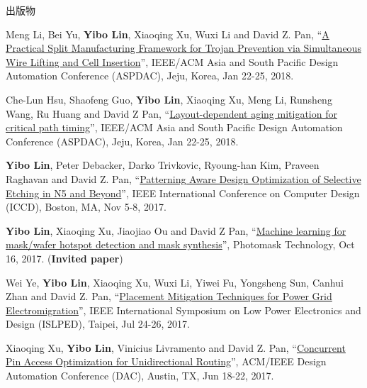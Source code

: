 \begin{rSection}{出版物}
\begin{description}[font=\normalfont]
{}
            

\item[{[C15]}]{
        Meng Li, Bei Yu, \textbf{Yibo Lin}, Xiaoqing Xu, Wuxi Li and David Z. Pan, 
    ``\href{https://doi.org/10.1109/ASPDAC.2018.8297316}{A Practical Split Manufacturing Framework for Trojan Prevention via Simultaneous Wire Lifting and Cell Insertion}'', 
    IEEE/ACM Asia and South Pacific Design Automation Conference (ASPDAC), Jeju, Korea, Jan 22-25, 2018.
    
}
            

\item[{[C14]}]{
        Che-Lun Hsu, Shaofeng Guo, \textbf{Yibo Lin}, Xiaoqing Xu, Meng Li, Runsheng Wang, Ru Huang and David Z Pan, 
    ``\href{https://doi.org/10.1109/ASPDAC.2018.8297298}{Layout-dependent aging mitigation for critical path timing}'', 
    IEEE/ACM Asia and South Pacific Design Automation Conference (ASPDAC), Jeju, Korea, Jan 22-25, 2018.
    
}
            

\item[{[C13]}]{
        \textbf{Yibo Lin}, Peter Debacker, Darko Trivkovic, Ryoung-han Kim, Praveen Raghavan and David Z. Pan, 
    ``\href{https://doi.org/10.1109/ICCD.2017.72}{Patterning Aware Design Optimization of Selective Etching in N5 and Beyond}'', 
    IEEE International Conference on Computer Design (ICCD), Boston, MA, Nov 5-8, 2017.
    
}
            

\item[{[C12]}]{
        \textbf{Yibo Lin}, Xiaoqing Xu, Jiaojiao Ou and David Z Pan, 
    ``\href{http://dx.doi.org/10.1117/12.2282943}{Machine learning for mask/wafer hotspot detection and mask synthesis}'', 
    Photomask Technology, Oct 16, 2017.
    (\textbf{Invited paper})
}
            

\item[{[C11]}]{
        Wei Ye, \textbf{Yibo Lin}, Xiaoqing Xu, Wuxi Li, Yiwei Fu, Yongsheng Sun, Canhui Zhan and David Z. Pan, 
    ``\href{https://doi.org/10.1109/ISLPED.2017.8009178}{Placement Mitigation Techniques for Power Grid Electromigration}'', 
    IEEE International Symposium on Low Power Electronics and Design (ISLPED), Taipei, Jul 24-26, 2017.
    
}
            

\item[{[C10]}]{
        Xiaoqing Xu, \textbf{Yibo Lin}, Vinicius Livramento and David Z. Pan, 
    ``\href{https://doi.org/10.1145/3061639.3062214}{Concurrent Pin Access Optimization for Unidirectional Routing}'', 
    ACM/IEEE Design Automation Conference (DAC), Austin, TX, Jun 18-22, 2017.
    
}
\end{description}
\end{rSection}
